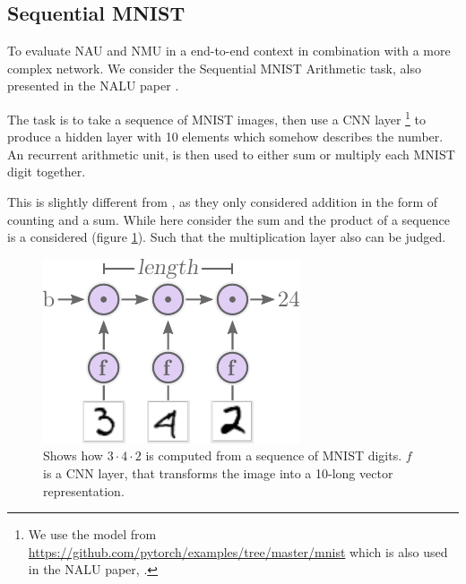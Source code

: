 \subsection{Sequential MNIST}

To evaluate NAU and NMU in a end-to-end context in combination with a more complex network. We consider the Sequential MNIST Arithmetic task, also presented in the NALU paper \cite{trask-nalu}.

The task is to take a sequence of MNIST images, then use a CNN layer \footnote{We use the model from \url{https://github.com/pytorch/examples/tree/master/mnist} which is also used in the NALU paper, \cite{trask-nalu}.} to produce a hidden layer with 10 elements which somehow describes the number. An recurrent arithmetic unit, is then used to either sum or multiply each MNIST digit together.

This is slightly different from \cite{trask-nalu}, as they only considered addition in the form of counting and a sum. While here consider the sum and the product of a sequence is a considered (figure \ref{fig:mnist-sequence-problem}). Such that the multiplication layer also can be judged.

\begin{figure}[H]
\centering
\includegraphics[scale=1]{graphics/mnist_sequence_problem.pdf}
\caption{Shows how $3 \cdot 4 \cdot2$ is computed from a sequence of MNIST digits. $f$ is a CNN layer, that transforms the image into a 10-long vector representation.}
\label{fig:mnist-sequence-problem}
\end{figure}


